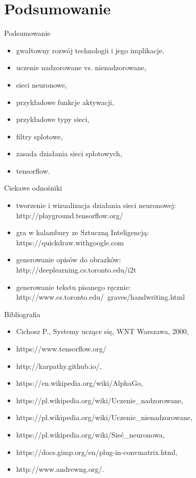 \documentclass[xcolor=dvipsnames]{beamer}
\begin{document}
\section{Podsumowanie}
\begin{frame}{Podsumowanie}
  \begin{itemize}
    \item gwałtowny rozwój technologii i jego implikacje,
    \item uczenie nadzorowane vs. nienadzorowane,
    \item sieci neuronowe,
    \item przykładowe funkcje aktywacji,
    \item przykładowe typy sieci,
    \item filtry splotowe,
    \item zasada działania sieci splotowych,
    \item tensorflow.
  \end{itemize}
\end{frame}
\begin{frame}{Ciekawe odnośniki}
	\begin{itemize}
		\item tworzenie i wizualizacja działania sieci neuronowej:\\
		http://playground.tensorflow.org/
		\item gra w kalambury ze Sztuczną Inteligencją:\\
		https://quickdraw.withgoogle.com
		\item generowanie opisów do obrazków:\\
		http://deeplearning.cs.toronto.edu/i2t
		\item generowanie tekstu pisanego ręcznie:\\
		http://www.cs.toronto.edu/~graves/handwriting.html
		
	\end{itemize}
\end{frame}
\begin{frame}{Bibliografia}
	\begin{itemize}
		\item Cichosz P., Systemy uczące się, WNT Warszawa, 2000,
		\item https://www.tensorflow.org/
		\item http://karpathy.github.io/,
		\item https://en.wikipedia.org/wiki/AlphaGo,
		\item https://pl.wikipedia.org/wiki/Uczenie\_nadzorowane,
		\item https://pl.wikipedia.org/wiki/Uczenie\_nienadzorowane,
		\item https://pl.wikipedia.org/wiki/Sieć\_neuronowa,
		\item https://docs.gimp.org/en/plug-in-convmatrix.html,
		\item http://www.andrewng.org/.
	\end{itemize}
\end{frame}
\end{document}
